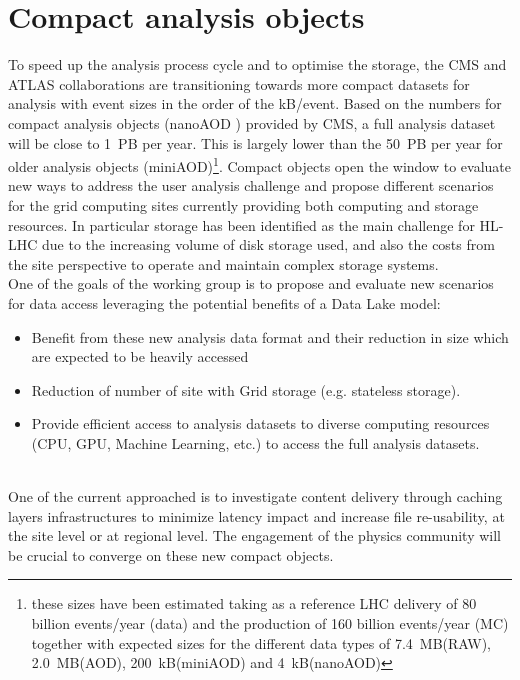 \section{Compact analysis objects}
To speed up the analysis process cycle and to optimise the storage, the CMS and ATLAS collaborations are transitioning towards more compact datasets for analysis with event sizes in the order of the kB/event. Based on the numbers for compact analysis objects (nanoAOD \cite{nano}) provided by CMS, a full analysis dataset will be close to 1~PB per year. This is largely lower than the 50~PB per year for older analysis objects (miniAOD)\footnote{ these sizes have been estimated taking as a reference LHC delivery of 80 billion events/year (data) and the production of 160 billion events/year (MC) together with expected sizes for the different data types of 7.4~MB(RAW), 2.0~MB(AOD), 200~kB(miniAOD) and 4~kB(nanoAOD)}. Compact objects open the window to evaluate new ways to address the user analysis challenge and propose different scenarios for the grid computing sites currently providing both computing and storage resources. In particular storage has been identified as the main challenge for HL-LHC due to the increasing volume of disk storage used, and also the costs from the site perspective to operate and maintain complex storage systems.\\
One of the goals of the working group is to propose and evaluate new scenarios for data access leveraging the potential benefits of a Data Lake model:
\begin{itemize}
\item Benefit from these new analysis data format and their reduction in size which are expected to be heavily accessed 
\item Reduction of number of site with Grid storage (e.g. stateless storage).
\item Provide efficient access to analysis datasets to diverse computing resources  (CPU, GPU, Machine Learning, etc.) to access the full analysis datasets.
\end{itemize}\\
One of the current approached is to investigate content delivery through caching layers infrastructures to minimize latency impact and increase file re-usability, at the site level or at regional level.
The engagement of the physics community will be crucial to converge on these new compact objects. %
